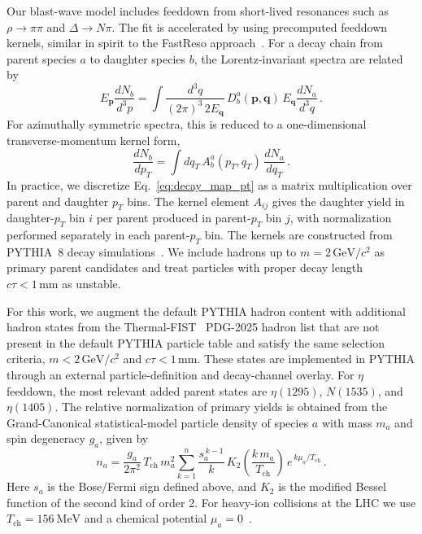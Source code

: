 \documentclass[%
 reprint,
 amsmath,amssymb,
 aps,
prc,
]{revtex4-2}
\begin{document}
Our blast-wave model includes feeddown from short-lived resonances such as $\rho \rightarrow \pi\pi$ and $\Delta \rightarrow N\pi$. The fit is accelerated by using precomputed feeddown kernels, similar in spirit to the FastReso approach~\cite{Mazeliauskas:2018irt,FastReso}. For a decay chain from parent species $a$ to daughter species $b$, the Lorentz-invariant spectra are related by
\begin{equation}
E_{\bm p}\frac{dN_b}{d^3p}
=
\int \frac{d^3q}{(2\pi)^3\,2E_{\bm q}}\,
D_b^a(\bm{p},\bm{q})\,
E_{\bm q}\frac{dN_a}{d^3q}\,.
\label{eq:decay_map_invariant}
\end{equation}
For azimuthally symmetric spectra, this is reduced to a one-dimensional transverse-momentum kernel form,
\begin{equation}
\frac{dN_b}{dp_T}
=
\int dq_T\,
A_b^a(p_T,q_T)\,
\frac{dN_a}{dq_T}\,.
\label{eq:decay_map_pt}
\end{equation}
In practice, we discretize Eq.~\eqref{eq:decay_map_pt} as a matrix multiplication over parent and daughter $p_T$ bins. The kernel element $A_{ij}$ gives the daughter yield in daughter-$p_T$ bin $i$ per parent produced in parent-$p_T$ bin $j$, with normalization performed separately in each parent-$p_T$ bin. The kernels are constructed from PYTHIA~8 decay simulations~\cite{Sjostrand:2014zea}. We include hadrons up to $m=2\,\mathrm{GeV}/c^2$ as primary parent candidates and treat particles with proper decay length $c\tau < 1\,\mathrm{mm}$ as unstable.

For this work, we augment the default PYTHIA hadron content with additional hadron states from the Thermal-FIST~\cite{Vovchenko:2019pjl} PDG-2025 hadron list that are not present in the default PYTHIA particle table and satisfy the same selection criteria, $m<2\,\mathrm{GeV}/c^2$ and $c\tau<1\,\mathrm{mm}$. These states are implemented in PYTHIA through an external particle-definition and decay-channel overlay. For $\eta$ feeddown, the most relevant added parent states are $\eta(1295)$, $N(1535)$, and $\eta(1405)$. The relative normalization of primary yields is obtained from the Grand-Canonical statistical-model particle density of species $a$ with mass $m_a$ and spin degeneracy $g_a$, given by~\cite{Cleymans:1999st}
\begin{equation}
n_a = \frac{g_a}{2\pi^2}\,T_\mathrm{ch}\,m_a^2
\sum_{k=1}^{n}
\frac{s_a^{\,k-1}}{k}\,
K_2\!\left(\frac{k\,m_a}{T_\mathrm{ch}}\right)\,
e^{\,k\mu_a/T_\mathrm{ch}} \,.
\end{equation}
Here $s_a$ is the Bose/Fermi sign defined above, and $K_2$ is the modified Bessel function of the second kind of order 2. For heavy-ion collisions at the LHC we use $T_\mathrm{ch} = 156~\mathrm{MeV}$ and a chemical potential $\mu_a = 0$~\cite{Andronic:2017pug}.
\end{document}
